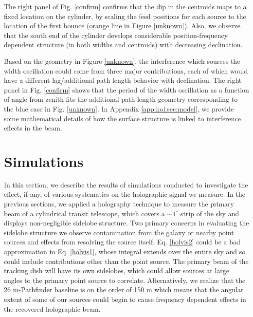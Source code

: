 The right panel of Fig. \ref{confirm} confirms that the dip in the centroids maps to a fixed location on the cylinder, by scaling the feed positions for each source to the location of the first bounce (orange line in Figure \ref{unknown}). Also, we observe that the south end of the cylinder develops considerable position-frequency dependent structure (in both widths and centroids) with decreasing declination.

Based on the geometry in Figure \ref{unknown}, the interference which sources the width oscillation could come from three major contributions, each of which would have a different lag/additional path length behavior with declination. The right panel in Fig. \ref{confirm} shows that the period of the width oscillation as a function of angle from zenith fits the additional path length geometry corresponding to the blue case in Fig. \ref{unknown}. In Appendix \ref{app:hol:sec:model}, we provide some mathematical details of how the surface structure is linked to interference effects in the beam.

\section{Simulations} \label{ch:hol:sec:sims}

In this section, we describe the results of simulations conducted to investigate the effect, if any, of various systematics on the holographic signal we measure. In the previous sections, we applied a holography technique to measure the primary beam of a cylindrical transit telescope, which covers a $\sim 1^{\circ}$ strip of the sky and displays non-negligible sidelobe structure. Two primary concerns in evaluating the sidelobe structure we observe contamination from the galaxy or nearby point sources and effects from resolving the source itself. Eq. \ref{holvis2} could be a bad approximation to Eq. \ref{holvis1}, whose integral extends over the entire sky and so could include contributions other than the point source. The primary beam of the tracking dish will have its own sidelobes, which could allow sources at large angles to the primary point source to correlate. Alternatively, we realize that the 26 m-Pathfinder baseline is on the order of 150 m which means that the angular extent of some of our sources could begin to cause frequency dependent effects in the recovered holographic beam. 

